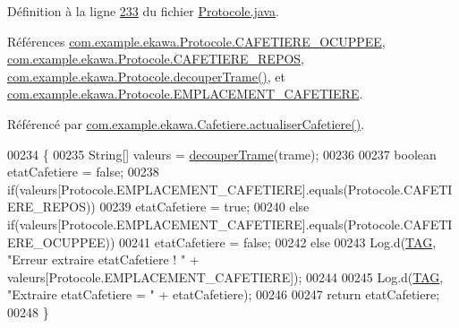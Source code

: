 Définition à la ligne \hyperlink{_protocole_8java_source_l00233}{233} du fichier \hyperlink{_protocole_8java_source}{Protocole.\+java}.



Références \hyperlink{_protocole_8java_source_l00041}{com.\+example.\+ekawa.\+Protocole.\+C\+A\+F\+E\+T\+I\+E\+R\+E\+\_\+\+O\+C\+U\+P\+P\+EE}, \hyperlink{_protocole_8java_source_l00042}{com.\+example.\+ekawa.\+Protocole.\+C\+A\+F\+E\+T\+I\+E\+R\+E\+\_\+\+R\+E\+P\+OS}, \hyperlink{_protocole_8java_source_l00208}{com.\+example.\+ekawa.\+Protocole.\+decouper\+Trame()}, et \hyperlink{_protocole_8java_source_l00040}{com.\+example.\+ekawa.\+Protocole.\+E\+M\+P\+L\+A\+C\+E\+M\+E\+N\+T\+\_\+\+C\+A\+F\+E\+T\+I\+E\+RE}.



Référencé par \hyperlink{_cafetiere_8java_source_l00543}{com.\+example.\+ekawa.\+Cafetiere.\+actualiser\+Cafetiere()}.


\begin{DoxyCode}
00234     \{
00235         String[] valeurs = \hyperlink{classcom_1_1example_1_1ekawa_1_1_protocole_a23c261e4ab5ad3c2ac60187f04ae40ea}{decouperTrame}(trame);
00236 
00237         \textcolor{keywordtype}{boolean} etatCafetiere = \textcolor{keyword}{false};
00238         \textcolor{keywordflow}{if}(valeurs[Protocole.EMPLACEMENT\_CAFETIERE].equals(Protocole.CAFETIERE\_REPOS))
00239             etatCafetiere = \textcolor{keyword}{true};
00240         \textcolor{keywordflow}{else} \textcolor{keywordflow}{if}(valeurs[Protocole.EMPLACEMENT\_CAFETIERE].equals(Protocole.CAFETIERE\_OCUPPEE))
00241             etatCafetiere = \textcolor{keyword}{false};
00242         \textcolor{keywordflow}{else}
00243             Log.d(\hyperlink{classcom_1_1example_1_1ekawa_1_1_protocole_ae9b68fa0daac528421b887f19413f8f5}{TAG}, \textcolor{stringliteral}{"Erreur extraire etatCafetiere ! "} + valeurs[Protocole.EMPLACEMENT\_CAFETIERE]);
00244 
00245         Log.d(\hyperlink{classcom_1_1example_1_1ekawa_1_1_protocole_ae9b68fa0daac528421b887f19413f8f5}{TAG}, \textcolor{stringliteral}{"Extraire etatCafetiere = "} + etatCafetiere);
00246 
00247         \textcolor{keywordflow}{return} etatCafetiere;
00248     \}
\end{DoxyCode}
\mbox{\label{classcom_1_1example_1_1ekawa_1_1_protocole_ad979442926a41d39052501267b5f5be3}} 
